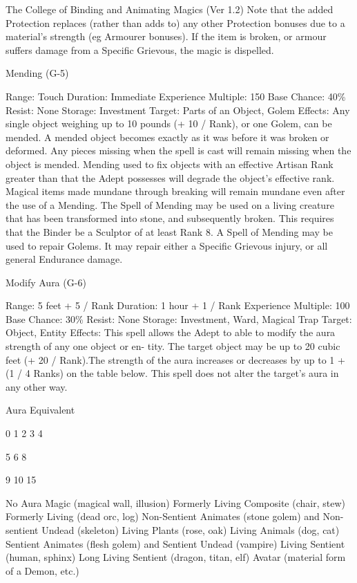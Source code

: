 \begin{Chapter}{The College of Binding and Animating Magics (Ver 1.2)}
Note that the added Protection replaces (rather than 
adds  to)  any  other  Protection  bonuses  due  to  a 
material’s  strength  (eg  Armourer  bonuses).  If  the 
item  is  broken,  or  armour  suffers  damage  from  a 
Specific Grievous, the magic is dispelled. 

Mending (G-5) 

Range: Touch 
Duration: Immediate 
Experience Multiple: 150 
Base Chance: 40\% 
Resist: None 
Storage: Investment 
Target: Parts of an Object, Golem 
Effects:  Any  single  object  weighing  up  to  10 
pounds  (+  10  /  Rank),  or  one  Golem,  can  be 
mended.  A  mended  object  becomes  exactly  as  it 
was before it was broken or deformed. Any pieces 
missing when the spell is cast will remain missing 
when  the  object  is  mended.  Mending  used  to  fix 
objects with an effective Artisan Rank greater than 
that  the  Adept  possesses  will  degrade  the  object’s 
effective  rank.  Magical  items  made  mundane 
through  breaking  will  remain  mundane  even  after 
the  use  of  a  Mending.  The  Spell  of  Mending  may 
be  used  on  a  living  creature  that  has  been  transformed  into  stone,  and  subsequently  broken.  This 
requires  that  the  Binder  be  a  Sculptor  of  at  least 
Rank 8. A Spell of Mending may be used to repair 
Golems.  It  may  repair  either  a  Specific  Grievous 
injury, or all general Endurance damage. 

Modify Aura (G-6) 

Range: 5 feet + 5 / Rank 
Duration: 1 hour + 1 / Rank 
Experience Multiple: 100 
Base Chance: 30\% 
Resist: None 
Storage: Investment, Ward, Magical Trap 
Target: Object, Entity 
Effects:  This  spell  allows  the  Adept  to  able  to 
modify  the  aura  strength  of  any  one  object  or  en-
tity. The target object may be up to 20 cubic feet (+ 
20  /  Rank).The  strength  of  the  aura  increases  or 
decreases  by  up  to  1  +  (1  /  4  Ranks)  on  the  table 
below. This spell does not alter the target’s aura in 
any other way. 

Aura  Equivalent 

0 
1 
2 
3 
4 

5 
6 
8 

9 
10 
15 

No Aura 
Magic (magical wall, illusion) 
Formerly Living Composite (chair, stew) 
Formerly Living (dead orc, log) 
Non-Sentient Animates (stone golem) and 
Non-sentient Undead (skeleton) 
Living Plants (rose, oak) 
Living Animals (dog, cat) 
Sentient Animates (flesh golem) and 
Sentient Undead (vampire) 
Living Sentient (human, sphinx) 
Long Living Sentient (dragon, titan, elf) 
Avatar (material form of a Demon, etc.) 


\end{Chapter}
